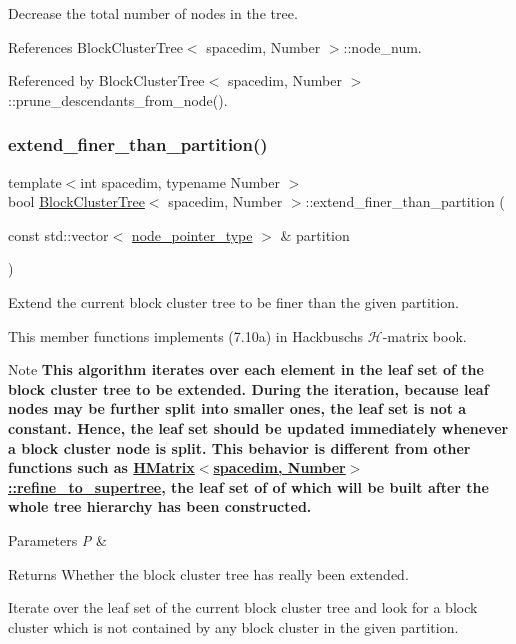 Decrease the total number of nodes in the tree. 

References Block\+Cluster\+Tree$<$ spacedim, Number $>$\+::node\+\_\+num.



Referenced by Block\+Cluster\+Tree$<$ spacedim, Number $>$\+::prune\+\_\+descendants\+\_\+from\+\_\+node().

\mbox{\label{classBlockClusterTree_a3c4a4da89b964559cc02ecbf13ad4a4b}} 
\subsubsection{\texorpdfstring{extend\+\_\+finer\+\_\+than\+\_\+partition()}{extend\_finer\_than\_partition()}}
{\footnotesize\ttfamily template$<$int spacedim, typename Number $>$ \\
bool \hyperlink{classBlockClusterTree}{Block\+Cluster\+Tree}$<$ spacedim, Number $>$\+::extend\+\_\+finer\+\_\+than\+\_\+partition (\begin{DoxyParamCaption}\item[{const std\+::vector$<$ \hyperlink{classTreeNode}{node\+\_\+pointer\+\_\+type} $>$ \&}]{partition }\end{DoxyParamCaption})}

Extend the current block cluster tree to be finer than the given partition.

This member functions implements (7.\+10a) in Hackbusch\textquotesingle{}s $\mathcal{H}$-\/matrix book.


\begin{DoxyDescription}
\item[Note ]{\bfseries This algorithm iterates over each element in the leaf set of the block cluster tree to be extended. During the iteration, because leaf nodes may be further split into smaller ones, the leaf set is not a constant. Hence, the leaf set should be updated immediately whenever a block cluster node is split. This behavior is different from other functions such as {\ttfamily \hyperlink{classHMatrix_ad2b353962226c78910d6ddb6b5b8e460}{H\+Matrix$<$spacedim, Number$>$\+::refine\+\_\+to\+\_\+supertree}}, the leaf set of of which will be built after the whole tree hierarchy has been constructed.}  
\end{DoxyDescription}
\begin{DoxyParams}{Parameters}
{\em P} & \\
\hline
\end{DoxyParams}
\begin{DoxyReturn}{Returns}
Whether the block cluster tree has really been extended. 
\end{DoxyReturn}
Iterate over the leaf set of the current block cluster tree and look for a block cluster which is not contained by any block cluster in the given partition.

